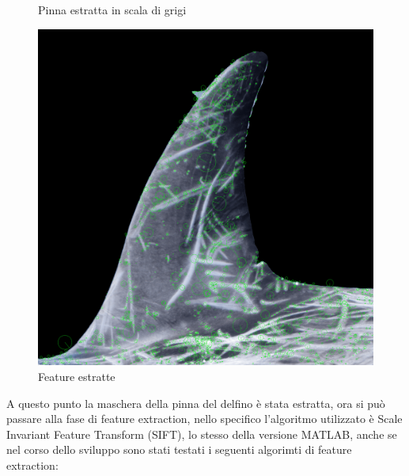 \documentclass[a4paper,12pt]{report}
\begin{document}
\begin{figure}[H]
\begin{minipage}{0.3\textwidth}
        \caption{Pinna estratta in scala di grigi}
      \end{minipage}
      \begin{minipage}{0.3\textwidth}
        \centering
        \includegraphics[width=\textwidth]{assets/images/methods/porting/features_extraction/features.png}   
        \caption{Feature estratte}
      \end{minipage}
    \end{figure}
    A questo punto la maschera della pinna del delfino è stata estratta, 
    ora si può passare alla fase di feature extraction, nello specifico l'algoritmo utilizzato 
    è Scale Invariant Feature Transform (SIFT), lo stesso della versione MATLAB,
    anche se nel corso dello sviluppo sono stati testati i seguenti algorimti di feature extraction:
\end{document}
